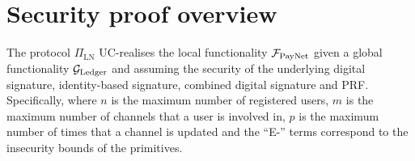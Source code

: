 \section{Security proof overview}
\label{sec:ov-security-proof}
  \begin{theorem}
    The protocol $\Pi_{\mathrm{LN}}$ UC-realises the local functionality
    $\mathcal{F}_{\mathrm{PayNet}}$ given a global functionality $\mathcal{G}_{\mathrm{Ledger}}$ and assuming the security
    of the underlying digital signature, identity-based signature, combined
    digital signature and PRF. Specifically,
    \label{theorem:simulation}
    where $n$ is the maximum number of registered users, $m$ is the maximum
    number of channels that a user is involved in, $p$ is the maximum number of
    times that a channel is updated and the ``E-'' terms correspond to the
    insecurity bounds of the primitives.
  \end{theorem}

